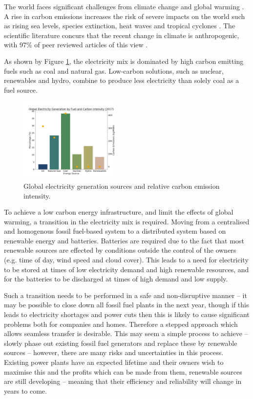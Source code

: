 
The world faces significant challenges from climate change and global warming \cite{Masson-Delmotte2018}. A rise in carbon emissions increases the risk of severe impacts on the world such as rising sea levels, species extinction, heat waves and tropical cyclones \cite{IPCC2014}. The scientific literature concurs that the recent change in climate is anthropogenic, with 97\% of peer reviewed articles of this view \cite{Cook2013}.  

As shown by Figure \ref{fig:fuel_emissions_market_share}, the electricity mix is dominated by high carbon emitting fuels such as coal and natural gas. Low-carbon solutions, such as nuclear, renewables and hydro, combine to produce less electricity than solely coal as a fuel source. 



\begin{figure}[b]
	\begin{center}
		\includegraphics[width=0.45\textwidth]{figures/elec_gen_carbon.png}
		\caption{Global electricity generation sources and relative carbon emission intensity. ~\cite{BP2018,Hall1983}}
		\label{fig:fuel_emissions_market_share}
	\end{center}
\end{figure}


To achieve a low carbon energy infrastructure, and limit the effects of global warming, a transition in the electricity mix is required. Moving from a centralised and homogenous fossil fuel-based system to a distributed system based on renewable energy and batteries. Batteries are required due to the fact that most renewable sources are effected by conditions outside the control of the owners (e.g. time of day, wind speed and cloud cover). This leads to a need for electricity to be stored at times of low electricity demand and high renewable resources, and for the batteries to be discharged at times of high demand and low supply. 

Such a transition needs to be performed in a safe and non-disruptive manner -- it may be possible to close down all fossil fuel plants in the next year, though if this leads to electricity shortages and power cuts then this is likely to cause significant problems both for companies and homes. Therefore a stepped approach which allows seamless transfer is desirable. This may seem a simple process to achieve -- slowly phase out existing fossil fuel generators and replace these by renewable sources -- however, there are many risks and uncertainties in this process. Existing power plants have an expected lifetime and their owners wish to maximise this and the profits which can be made from them, renewable sources are still developing -- meaning that their efficiency and reliability will change in years to come.

